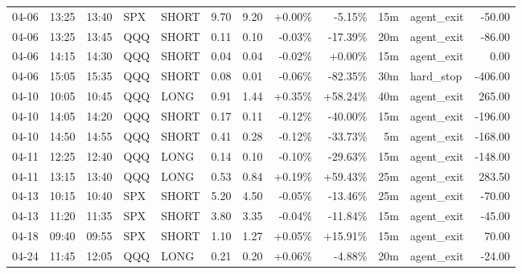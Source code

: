 \documentclass[11pt,a4paper]{article}
\begin{document}
\begin{center}
\begin{longtable}{>{\color{txtmain}}l l l l l r r r r r >{\color{txtmain}}l r}
04-06 & 13:25 & 13:40 & SPX & SHORT & 9.70 & 9.20 & \textcolor{wingreen}{+0.00\%} & \textcolor{lossred}{-5.15\%} & 15m & agent\_exit & \textcolor{lossred}{-50.00} \\
04-06 & 13:25 & 13:45 & QQQ & SHORT & 0.11 & 0.10 & \textcolor{lossred}{-0.03\%} & \textcolor{lossred}{-17.39\%} & 20m & agent\_exit & \textcolor{lossred}{-86.00} \\
04-06 & 14:15 & 14:30 & QQQ & SHORT & 0.04 & 0.04 & \textcolor{lossred}{-0.02\%} & \textcolor{wingreen}{+0.00\%} & 15m & agent\_exit & \textcolor{wingreen}{0.00} \\
04-06 & 15:05 & 15:35 & QQQ & SHORT & 0.08 & 0.01 & \textcolor{lossred}{-0.06\%} & \textcolor{lossred}{-82.35\%} & 30m & hard\_stop & \textcolor{lossred}{-406.00} \\
04-10 & 10:05 & 10:45 & QQQ & LONG & 0.91 & 1.44 & \textcolor{wingreen}{+0.35\%} & \textcolor{wingreen}{+58.24\%} & 40m & agent\_exit & \textcolor{wingreen}{265.00} \\
04-10 & 14:05 & 14:20 & QQQ & SHORT & 0.17 & 0.11 & \textcolor{lossred}{-0.12\%} & \textcolor{lossred}{-40.00\%} & 15m & agent\_exit & \textcolor{lossred}{-196.00} \\
04-10 & 14:50 & 14:55 & QQQ & SHORT & 0.41 & 0.28 & \textcolor{lossred}{-0.12\%} & \textcolor{lossred}{-33.73\%} & 5m & agent\_exit & \textcolor{lossred}{-168.00} \\
04-11 & 12:25 & 12:40 & QQQ & LONG & 0.14 & 0.10 & \textcolor{lossred}{-0.10\%} & \textcolor{lossred}{-29.63\%} & 15m & agent\_exit & \textcolor{lossred}{-148.00} \\
04-11 & 13:15 & 13:40 & QQQ & LONG & 0.53 & 0.84 & \textcolor{wingreen}{+0.19\%} & \textcolor{wingreen}{+59.43\%} & 25m & agent\_exit & \textcolor{wingreen}{283.50} \\
04-13 & 10:15 & 10:40 & SPX & SHORT & 5.20 & 4.50 & \textcolor{lossred}{-0.05\%} & \textcolor{lossred}{-13.46\%} & 25m & agent\_exit & \textcolor{lossred}{-70.00} \\
04-13 & 11:20 & 11:35 & SPX & SHORT & 3.80 & 3.35 & \textcolor{lossred}{-0.04\%} & \textcolor{lossred}{-11.84\%} & 15m & agent\_exit & \textcolor{lossred}{-45.00} \\
04-18 & 09:40 & 09:55 & SPX & SHORT & 1.10 & 1.27 & \textcolor{wingreen}{+0.05\%} & \textcolor{wingreen}{+15.91\%} & 15m & agent\_exit & \textcolor{wingreen}{70.00} \\
04-24 & 11:45 & 12:05 & QQQ & LONG & 0.21 & 0.20 & \textcolor{wingreen}{+0.06\%} & \textcolor{lossred}{-4.88\%} & 20m & agent\_exit & \textcolor{lossred}{-24.00} \\

\end{longtable}
\end{center}
\end{document}

